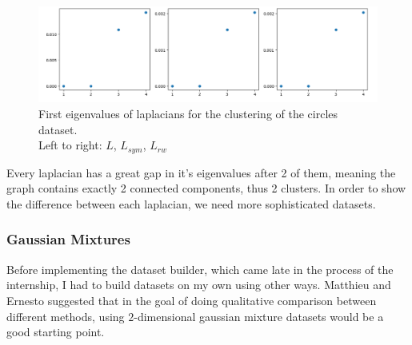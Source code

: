 \documentclass[a4paper,12pt]{article}
\theoremstyle{definition}
\theoremstyle{plain}
\begin{document}
\begin{figure}[H]
	\centering
	\captionsetup{justification=centering}
	\includegraphics[width=0.9\linewidth]{figures/Fig_E1_circles} %
	\caption{First eigenvalues of laplacians for the clustering of the circles dataset. \\ Left to right: $L$, $L_{sym}$, $L_{rw}$}
	\label{fig:fige1circles}
\end{figure}


Every laplacian has a great gap in it's eigenvalues after 2 of them, meaning the graph contains exactly 2 connected components, thus 2 clusters.
In order to show the difference between each laplacian, we need more sophisticated datasets.

\subsubsection{Gaussian Mixtures}
Before implementing the dataset builder, which came late in the process of the internship, I had to build datasets on my own using other ways. Matthieu and Ernesto suggested that in the goal of doing qualitative comparison between different methods, using $2$-dimensional gaussian mixture datasets would be a good starting point. 
\end{document}
